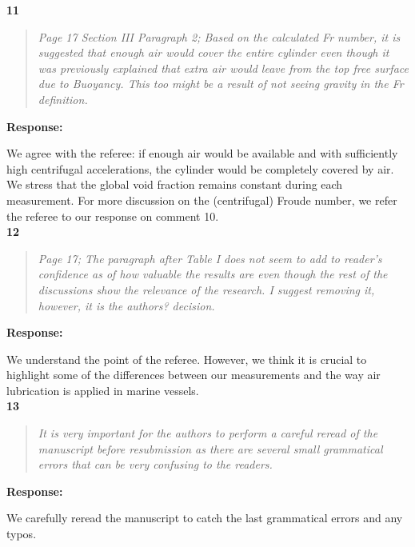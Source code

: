 \documentclass[10pt]{article}
\newcommand{\strong}[1]{\textbf{#1}}
\newcommand{\question}[1]{\begin{quote} \emph{#1}  \end{quote} }
\begin{document}
\noindent \strong{11}

\question{Page 17 Section III Paragraph 2; Based on the calculated Fr number, it is suggested that enough air would cover the entire cylinder even though it was previously explained that extra air would leave from the top free surface due to Buoyancy. This too might be a result of not seeing gravity in the Fr definition. }

\noindent \strong{Response:} 

\noindent We agree with the referee: if enough air would be available and with sufficiently high centrifugal accelerations, the cylinder would be completely covered by air. We stress that the global void fraction remains constant during each measurement. For more discussion on the (centrifugal) Froude number, we refer the referee to our response on comment 10.\\

\noindent \strong{12}

\question{Page 17; The paragraph after Table I does not seem to add to reader's confidence as of how valuable the results are even though the rest of the discussions show the relevance of the research. I suggest removing it, however, it is the authors? decision. }

\noindent \strong{Response:} 

\noindent We understand the point of the referee. However, we think it is crucial to highlight some of the differences between our measurements and the way air lubrication is applied in marine vessels. \\

\noindent \strong{13}

\question{It is very important for the authors to perform a careful reread of the manuscript before resubmission as there are several small grammatical errors that can be very confusing to the readers. }

\noindent \strong{Response:} 

\noindent We carefully reread the manuscript to catch the last grammatical errors and any typos.\\




	
\end{document}
